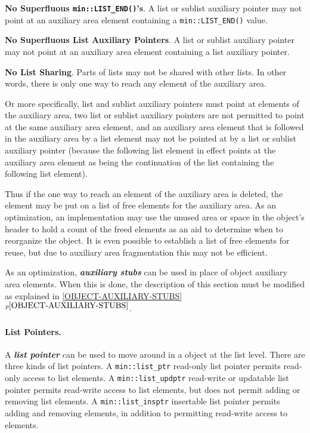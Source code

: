 \documentclass[12pt]{article}
\newcommand{\subsubsubsection}[1]{\paragraph[#1]{#1.}}
\newcommand{\key}[1]{{\bf \em #1}\index{#1}}
\newcommand{\skey}[2]{{\bf \em #1#2}\index{#1}}
\newcommand{\itemref}[1]{\ref{#1}$^{p\pageref{#1}}$}
\newcommand{\EOL}{\penalty \exhyphenpenalty}
\newenvironment{indpar}[1][0.3in]%
	{\begin{list}{}%
		     {\setlength{\itemsep}{0in}%
		      \setlength{\topsep}{0in}%
		      \setlength{\parsep}{1ex}%
		      \setlength{\labelwidth}{#1}%
		      \setlength{\leftmargin}{#1}%
		      \addtolength{\leftmargin}{\labelsep}}%
	 \item}%
	{\end{list}}
\begin{document}
\begin{indpar}
{\bf No Superfluous {\tt \bf min::LIST\_END()}'s}.%
%
\label{NO-SUPERFLUOUS-LIST}
A list or sublist auxiliary pointer may not point at an auxiliary
area element containing a \verb|min::LIST_END()| value.

{\bf No Superfluous List Auxiliary Pointers}.%
A list or sublist auxiliary pointer may not point at an auxiliary
area element containing a list auxiliary pointer.

{\bf No List Sharing}.%
Parts of lists may not be shared with other lists.  In other words,
there is only one way to reach any element of the auxiliary area.

Or more specifically, list and sublist
auxiliary pointers must point at elements of the auxiliary area,
two list or sublist auxiliary pointers are not permitted to point
at the same auxiliary
area element, and an auxiliary area element that is followed
in the auxiliary area by a list element may not be pointed at by
a list or sublist auxiliary pointer (because the following list element
in effect points at the auxiliary area element as being the
continuation of the list containing the following list element).
\end{indpar}

Thus if the one way to reach an element of
the auxiliary area is deleted, the element may be put on a list of
free elements for the auxiliary area.  As an optimization,
an implementation may use the unused area or space in the object's header
to hold a count of the freed elements as an aid to determine when to
reorganize the object.  It is even possible to establish a list of
free elements for reuse, but due to auxiliary area fragmentation this
may not be efficient.

As an optimization, \skey{auxiliary stub}s can be used in place of object
auxiliary area elements.  When this is done, the description of this
section must be modified as explained in \itemref{OBJECT-AUXILIARY-STUBS}.

\subsubsubsection{List Pointers}
\label{LIST-POINTERS}

A \key{list pointer} can be used to move around in a object at
the list level.
There are three kinds of list pointers.
A \verb|min::list_ptr| read-only list pointer permits read-only access to list
elements.
A {\tt min::\EOL list\_\EOL updptr} read-write or updatable list pointer
permits read-write access to list elements, but does not permit
adding or removing list elements.
A {\tt min::\EOL list\_\EOL insptr} insertable list pointer
permits adding and removing elements, in addition to permitting
read-write access to elements.
\end{document}
